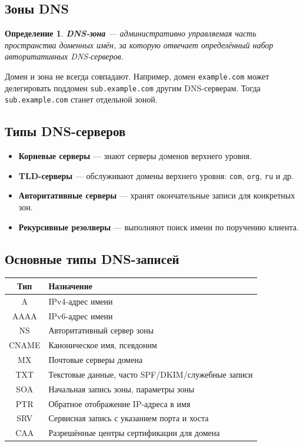 \documentclass[12pt,a4paper]{article}
\newtheorem{definition}{Определение}
\begin{document}
\subsection{Зоны DNS}

\begin{definition}
\textbf{DNS-зона} --- административно управляемая часть пространства доменных имён, за которую отвечает определённый набор авторитативных DNS-серверов.
\end{definition}

Домен и зона не всегда совпадают. Например, домен \texttt{example.com} может делегировать поддомен \texttt{sub.example.com} другим DNS-серверам. Тогда \texttt{sub.example.com} станет отдельной зоной.

\subsection{Типы DNS-серверов}

\begin{itemize}
    \item \textbf{Корневые серверы} --- знают серверы доменов верхнего уровня.
    \item \textbf{TLD-серверы} --- обслуживают домены верхнего уровня: \texttt{com}, \texttt{org}, \texttt{ru} и др.
    \item \textbf{Авторитативные серверы} --- хранят окончательные записи для конкретных зон.
    \item \textbf{Рекурсивные резолверы} --- выполняют поиск имени по поручению клиента.
\end{itemize}

\subsection{Основные типы DNS-записей}

\begin{center}
\begin{tabular}{|c|p{9cm}|}
\hline
\textbf{Тип} & \textbf{Назначение} \\
\hline
A & IPv4-адрес имени \\
\hline
AAAA & IPv6-адрес имени \\
\hline
NS & Авторитативный сервер зоны \\
\hline
CNAME & Каноническое имя, псевдоним \\
\hline
MX & Почтовые серверы домена \\
\hline
TXT & Текстовые данные, часто SPF/DKIM/служебные записи \\
\hline
SOA & Начальная запись зоны, параметры зоны \\
\hline
PTR & Обратное отображение IP-адреса в имя \\
\hline
SRV & Сервисная запись с указанием порта и хоста \\
\hline
CAA & Разрешённые центры сертификации для домена \\
\hline
\end{tabular}
\end{center}
\end{document}
